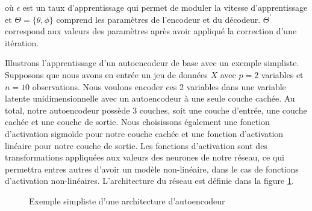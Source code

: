 \noindent où $\epsilon$ est un taux d'apprentissage qui permet de moduler la vitesse d'apprentissage et $\Theta = \{\theta, \phi\}$ comprend les paramètres de l'encodeur et du décodeur. $\Theta^{'}$ correspond aux valeurs des paramètres après avoir appliqué la correction d'une itération.

Illustrons l'apprentissage d'un autoencodeur de base avec un exemple simpliste. Supposons que nous avons en entrée un jeu de données $X$ avec $p=2$ variables et $n=10$ observations. Nous voulons encoder ces 2 variables dans une variable latente unidimensionnelle avec un autoencodeur à une seule couche cachée. Au total, notre autoencodeur possède 3 couches, soit une couche d'entrée, une couche cachée et une couche de sortie. Nous choisissons également une fonction d'activation sigmoïde pour notre couche cachée et une fonction d'activation linéaire pour notre couche de sortie. Les fonctions d'activation sont des transformations appliquées aux valeurs des neurones de notre réseau, ce qui permettra entres autres d'avoir un modèle non-linéaire, dans le cas de fonctions d'activation non-linéaires. L'architecture du réseau est définie dans la figure \ref{fig:toyAE}.

\begin{figure}[htb]
	\centering
	\caption{Exemple simpliste d'une architecture d'autoencodeur}
	\label{fig:toyAE}
\end{figure}

